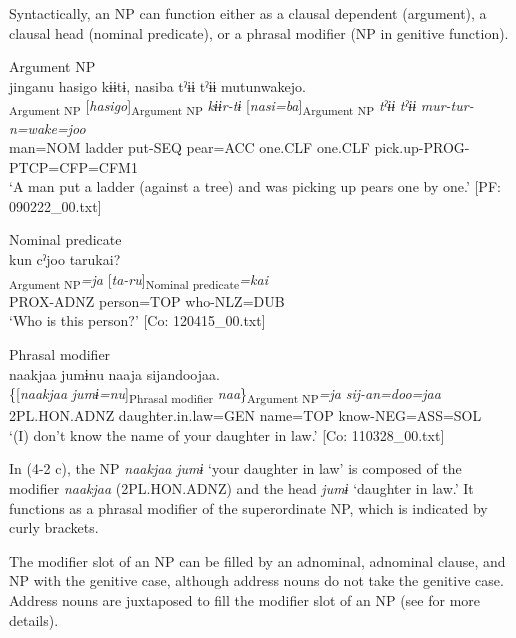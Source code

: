 Syntactically, an NP can function either as a clausal dependent (argument), a clausal head (nominal predicate), or a phrasal modifier (NP in genitive function).

\ea\label{ex:4.2}
\ea\label{ex:4.2a}Argument NP\\
\glll      jinganu  {\textbar}hasigo{\textbar}  kɨɨtɨ,  nasiba   tˀɨɨ  tˀɨɨ  mutunwakejo.\\
      [\textit{jinga=nu}]\textsubscript{Argument NP}  [\textit{hasigo}]\textsubscript{Argument NP}  \textit{kɨɨr-tɨ}  [\textit{nasi=ba}]\textsubscript{Argument NP}         \textit{tˀɨɨ}  \textit{tˀɨɨ}  \textit{mur-tur-n=wake=joo}\\
      man=NOM  ladder  put-SEQ  pear=ACC      one.CLF  one.CLF  pick.up-PROG-PTCP=CFP=CFM1     \\
      \glt       ‘A man put a ladder (against a tree) and was picking up pears one by one.’ [PF: 090222\_00.txt]

\ex\label{ex:4.2b}Nominal predicate\\
\glll     kun  cˀjoo  tarukai?\\
      [\textit{ku-n}  \textit{cˀju}]\textsubscript{Argument NP}\textit{=ja}  [\textit{ta-ru}]\textsubscript{Nominal predicate}\textit{=kai}\\
      PROX-ADNZ  person=TOP  who-NLZ=DUB\\
      \glt       ‘Who is this person?’ [Co: 120415\_00.txt]

\ex\label{ex:4.2c}Phrasal modifier\\
\glll      naakjaa  jumɨnu  naaja  sijandoojaa.\\
      \{[\textit{naakjaa}  \textit{jumɨ=nu}]\textsubscript{Phrasal modifier}  \textit{naa}\}\textsubscript{Argument NP}\textit{=ja}  \textit{sij-an=doo=jaa}\\
      2PL.HON.ADNZ  daughter.in.law=GEN  name=TOP  know-NEG=ASS=SOL\\
      \glt       ‘(I) don’t know the name of your daughter in law.’ [Co: 110328\_00.txt]
    \z
\z

In (4-2 c), the NP \textit{naakjaa} \textit{jumɨ} ‘your daughter in law’ is composed of the modifier \textit{naakjaa} (2PL.HON.ADNZ) and the head \textit{jumɨ} ‘daughter in law.’ It functions as a phrasal modifier of the superordinate NP, which is indicated by curly brackets.

The modifier slot of an NP can be filled by an adnominal, adnominal clause, and NP with the genitive case, although address nouns do not take the genitive case. Address nouns are juxtaposed to fill the modifier slot of an NP (see  for more details).


